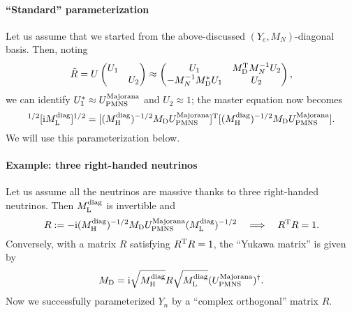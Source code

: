 \documentclass[CheatSheet]{subfiles}
\newcommand\MD[1][]{M_{\mathrm{D}#1}}
\newcommand\MN[1][]{M_{N#1}}
\begin{document}
\paragraph{``Standard'' parameterization}
Let us assume that we started from the above-discussed $(Y_e,\MN)$-diagonal basis.
Then, noting
\begin{equation}
 \tilde R=U\pmat{U_1\\&U_2}\approx \pmat{U_1 & \MD^\TT\MN^{-1}U_2 \\ -\MN^{-1}\MD^* U_1 & U_2},
\end{equation}
we can identify $U_1^*\approx U^{\text{Majorana}}_{\mathrm{PMNS}}$ and $U_2\approx 1$; the master equation now becomes
\begin{equation}
 [\ii M\w L\wdiag]^{1/2}[\ii M\w L\wdiag]^{1/2} =
[(M\w H\wdiag)^{-1/2}\MD U^{\text{Majorana}}\w{PMNS}]^\TT
[(M\w H\wdiag)^{-1/2}\MD U^{\text{Majorana}}\w{PMNS}].
\end{equation}
We will use this parameterization below.

\paragraph{Example: three right-handed neutrinos}
Let us assume all the neutrinos are massive thanks to three right-handed neutrinos. Then $M_{\mathrm{L}}^{\text{diag}}$ is invertible and
\begin{equation}
 R:=-\ii (M\w H\wdiag)^{-1/2}\MD  U^{\text{Majorana}}\w{PMNS}  (M\w L^\text{diag})^{-1/2}
\quad\Longrightarrow\quad R^\TT R=1.
\end{equation}
Conversely, with a matrix $R$ satisfying $R^{\mathrm{T}} R=1$, the ``Yukawa matrix'' is given by
\begin{equation}
 \MD = \ii \sqrt{M\w H^\text{diag}}R\sqrt{M\w L^\text{diag}}(U^{\text{Majorana}}\w{PMNS} )^\dagger.
\end{equation}
Now we successfully parameterized $Y_n$ by a ``complex orthogonal'' matrix $R$.
\end{document}
